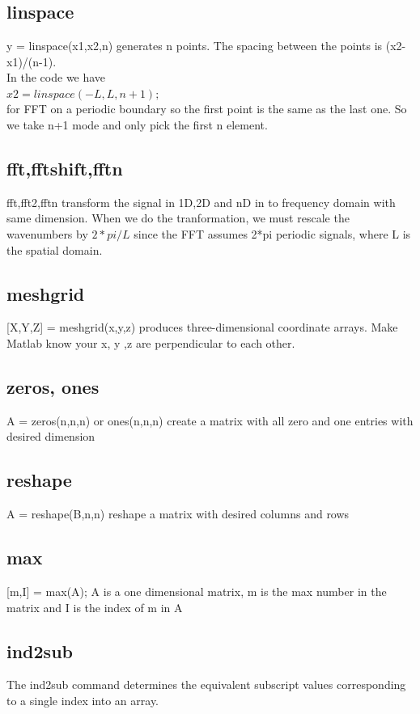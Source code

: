 \documentclass[12pt,letterpaper]{article}
\begin{document}
\appendix
\section{}
\subsection{linspace}
y = linspace(x1,x2,n) generates n points. The spacing between the points is (x2-x1)/(n-1).\\
In the code we have \\
$x2=linspace(-L,L,n+1);$\\
for FFT on a periodic boundary so the first point is the same as the last one. So we take n+1 mode and only pick the first n element.

\subsection{fft,fftshift,fftn}
fft,fft2,fftn transform the signal in 1D,2D and nD in to frequency domain with same dimension. When we do the tranformation, we must rescale the wavenumbers by $2*pi/L$ since the FFT assumes 2*pi periodic signals, where L is the spatial domain.

\subsection{meshgrid}
[X,Y,Z] = meshgrid(x,y,z) produces three-dimensional coordinate arrays. Make Matlab know your x, y ,z are perpendicular to each other.

\subsection{zeros, ones}
A = zeros(n,n,n) or ones(n,n,n) create a matrix with all zero and one entries with desired dimension

\subsection{reshape}
A = reshape(B,n,n) reshape a matrix with desired columns and rows

\subsection{max}
[m,I] = max(A);
A is a one dimensional matrix, m is the max number in the matrix and I is the index of m in A

\subsection{ind2sub}
The ind2sub command determines the equivalent subscript values corresponding to a single index into an array.
\end{document}
